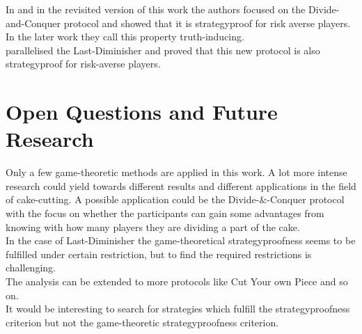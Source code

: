 In \cite{dc} and in the revisited version of this work \cite{dc2} the authors focused on the Divide-and-Conquer protocol and showed that it is strategyproof for risk averse players. In the later work they call this property truth-inducing. \\ \cite{lindner:degrees} parallelised the Last-Diminisher and proved that this new protocol is also strategyproof for risk-averse players.%
\section{Open Questions and Future Research}
Only a few game-theoretic methods are applied in this work. A lot more intense research could yield towards different results and different applications in the field of cake-cutting. A possible application could be the  Divide-$\&$-Conquer protocol with the focus on whether the participants can gain some advantages from knowing with how many players they are dividing a part of the cake.\\
In the case of Last-Diminisher the game-theoretical strategyproofness seems to be fulfilled under certain restriction, but to find the required restrictions is challenging.\\
The analysis can be extended to more protocols like Cut Your own Piece and so on.\\
It would be interesting to search for strategies which fulfill the strategyproofness criterion but not the game-theoretic strategyproofness criterion.\\
